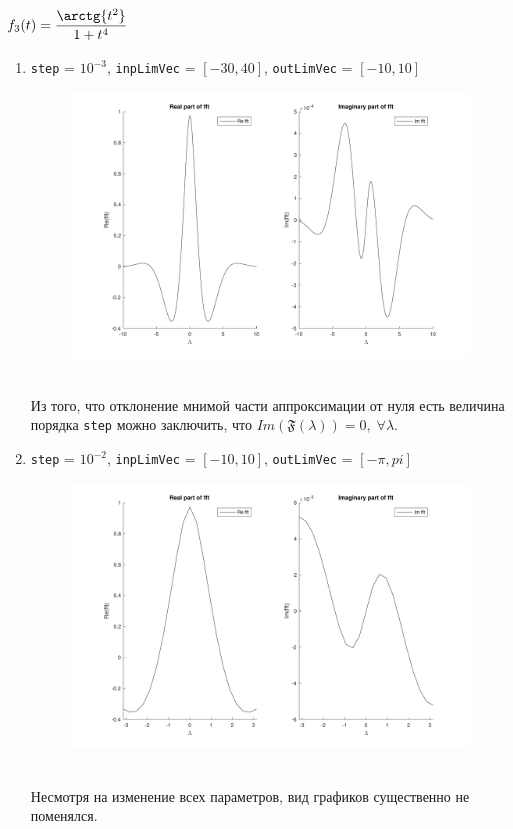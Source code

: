 \documentclass[11pt, oneside, final]{article}
\numberwithin{equation}{section}
\newcommand \four[1][\lambda]{\mathfrak{F}(#1)}
\begin{document}
    \subsection{\( f_3(t) = \dfrac{\arctg{t^2}}{1 + t^4}\)} %
    \begin{enumerate}
        \item
        \label{it:f31}
        \texttt{step} = \(10^{-3}\), \texttt{inpLimVec} = \( [-30, 40] \), \texttt{outLimVec} = \( [-10, 10] \)
        \begin{figure}[!h]
            \centering
            \includegraphics[width=\linewidth]{f3fig1}
            \label{pic:f3:1}
        \end{figure} \\
        Из того, что отклонение мнимой части аппроксимации от нуля есть величина порядка \texttt{step} можно заключить,
        что \(Im(\four) = 0, \; \forall \lambda \). 
        \clearpage
        \item
        \label{it:f32}
        \texttt{step} = \(10^{-2}\), \texttt{inpLimVec} = \( [-10, 10] \), \texttt{outLimVec} = \( [-\pi, pi] \)
        \begin{figure}[!h]
            \centering
            \includegraphics[width=\linewidth]{f3fig2}
            \label{pic:f3:2}
        \end{figure} \\
        Несмотря на изменение всех параметров, вид графиков существенно не поменялся.
    \label{sub:f3}
    
    \end{enumerate}
    \appendix
\end{document}
